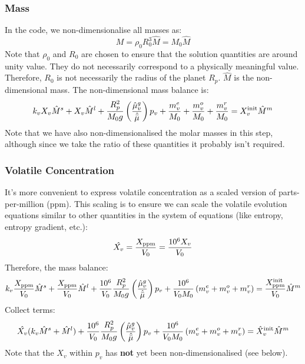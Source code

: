 \subsubsection{Mass}
In the code, we non-dimensionalise all masses as:
\begin{equation}
M = \rho_0 R_0^3 \hat{M} = M_0 \hat{M}
\end{equation}
Note that $\rho_0$ and $R_0$ are chosen to ensure that the solution quantities are around unity value.  They do not necessarily correspond to a physically meaningful value.  Therefore, $R_0$ is not necessarily the radius of the planet $R_p$.  $\hat{M}$ is the non-dimensional mass.  The non-dimensional mass balance is:
\begin{equation}
k_v X_v \hat{M}^s + X_v \hat{M}^l + \frac{R_p^2}{M_0 g} \left( \frac{\hat{\mu}_v^g}{\hat{\bar{\mu}}} \right) p_v + \frac{m_v^e}{M_0} + \frac{m_v^o}{M_0} + \frac{m_v^r}{M_0} = X_v^{\rm init} \hat{M}^m
\end{equation}
Note that we have also non-dimensionalised the molar masses in this step, although since we take the ratio of these quantities it probably isn't required.
\subsubsection{Volatile Concentration}
It's more convenient to express volatile concentration as a scaled version of parts-per-million (ppm).  This scaling is to ensure we can scale the volatile evolution equations similar to other quantities in the system of equations (like entropy, entropy gradient, etc.):
\begin{equation}
\hat{X_v} = \frac{X_{\rm ppm}}{V_0} = \frac{10^6 X_v}{V_0}
\end{equation}
Therefore, the mass balance:
\begin{equation}
k_v \frac{X_{\rm ppm}}{V_0} \hat{M}^s + \frac{X_{\rm ppm}}{V_0} \hat{M}^l + \frac{10^6}{V_0} \frac{R_p^2}{M_0 g} \left( \frac{\hat{\mu}_v^g}{\hat{\bar{\mu}}} \right) p_v + \frac{10^6}{V_0 M_0} \left( m_v^e + m_v^o + m_v^r \right) = \frac{X_{\rm ppm}^{\rm init}}{V_0} \hat{M}^m
\end{equation}
Collect terms:
\begin{equation}
\hat{X_v} (k_v \hat{M}^s + \hat{M}^l) + \frac{10^6}{V_0}\frac{R_p^2}{M_0 g} \left( \frac{\hat{\mu}_v^g}{\hat{\bar{\mu}}} \right) p_v + \frac{10^6}{V_0 M_0} \left( m_v^e + m_v^o + m_v^r \right) = \hat{X}_v^{\rm init} \hat{M}^m
\end{equation}
Note that the $X_v$ within $p_v$ has \textbf{not} yet been non-dimensionalised (see below).

